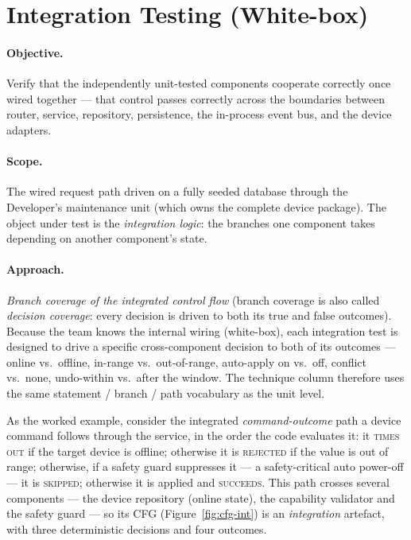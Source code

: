 \section{Integration Testing (White-box)}
\label{sec:qa-integration}

\paragraph{Objective.} Verify that the independently unit-tested components
cooperate correctly once wired together --- that control passes correctly across
the boundaries between router, service, repository, persistence, the in-process
event bus, and the device adapters.

\paragraph{Scope.} The wired request path driven on a fully seeded database
through the Developer's maintenance unit (which owns the complete device package).
The object under test is the \emph{integration logic}: the branches one component
takes depending on another component's state.

\paragraph{Approach.} \emph{Branch coverage of the integrated control flow}
(branch coverage is also called \emph{decision coverage}: every decision is driven to
both its true and false outcomes). Because the team knows the internal wiring
(white-box), each integration test is designed to drive a specific cross-component
decision to both of its outcomes --- online vs.\ offline, in-range vs.\
out-of-range, auto-apply on vs.\ off, conflict vs.\ none, undo-within vs.\ after the
window. The technique column therefore uses the same statement / branch / path
vocabulary as the unit level.

As the worked example, consider the integrated \emph{command-outcome} path a
device command follows through the service, in the order the code evaluates it: it
\textsc{times out} if the target device is offline; otherwise it is
\textsc{rejected} if the value is out of range; otherwise, if a safety guard
suppresses it --- a safety-critical auto power-off --- it is \textsc{skipped};
otherwise it is applied and \textsc{succeeds}. This path crosses several
components --- the device repository (online state), the capability validator and
the safety guard --- so its CFG (Figure~\ref{fig:cfg-int}) is an \emph{integration}
artefact, with three deterministic decisions and four outcomes.

